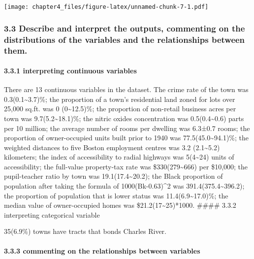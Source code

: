 \documentclass[
]{article}
\begin{document}
\texttt{[image: chapter4\_files/figure-latex/unnamed-chunk-7-1.pdf]}

\hypertarget{describe-and-interpret-the-outputs-commenting-on-the-distributions-of-the-variables-and-the-relationships-between-them.}{%
\subsubsection{3.3 Describe and interpret the outputs, commenting on the
distributions of the variables and the relationships between
them.}\label{describe-and-interpret-the-outputs-commenting-on-the-distributions-of-the-variables-and-the-relationships-between-them.}}

\hypertarget{interpreting-continuous-variables}{%
\paragraph{3.3.1 interpreting continuous
variables}\label{interpreting-continuous-variables}}

There are 13 continuous variables in the dataset. The crime rate of the
town was 0.3(0.1\textasciitilde3.7)\%; the proportion of a town's
residential land zoned for lots over 25,000 sq.ft. was 0
(0\textasciitilde12.5)\%; the proportion of non-retail business acres
per town was 9.7(5.2\textasciitilde18.1)\%; the nitric oxides
concentration was 0.5(0.4\textasciitilde0.6) parts per 10 million; the
average number of rooms per dwelling was 6.3±0.7 rooms; the proportion
of owner-occupied units built prior to 1940 was
77.5(45.0\textasciitilde94.1)\%; the weighted distances to five Boston
employment centres was 3.2 (2.1\textasciitilde5.2) kilometers; the index
of accessibility to radial highways was 5(4\textasciitilde24) units of
accessibility; the full-value property-tax rate was
\$330(279\textasciitilde666) per \$10,000; the pupil-teacher ratio by
town was 19.1(17.4\textasciitilde20.2); the Black proportion of
population after taking the formula of 1000(Bk-0.63)\^{}2 was
391.4(375.4\textasciitilde396.2); the proportion of population that is
lower status was 11.4(6.9\textasciitilde17.0)\%; the median value of
owner-occupied homes was \$21.2(17\textasciitilde25)*1000. \#\#\#\#
3.3.2 interpreting categorical variable

35(6.9\%) towns have tracts that bonds Charles River.

\hypertarget{commenting-on-the-relationships-between-variables}{%
\paragraph{3.3.3 commenting on the relationships between
variables}\label{commenting-on-the-relationships-between-variables}}
\end{document}
